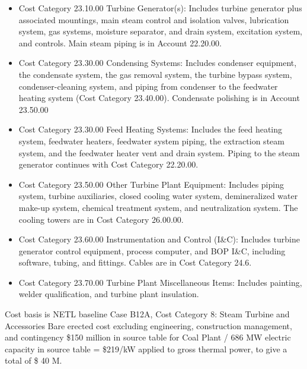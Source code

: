 \begin{itemize}
    \item Cost Category 23.10.00 Turbine Generator(s): Includes turbine generator plus associated mountings, main steam control and isolation valves, lubrication system, gas systems, moisture separator, and drain system, excitation system, and controls. Main steam piping is in Account 22.20.00.
    \item Cost Category 23.30.00 Condensing Systems: Includes condenser equipment, the condensate system, the gas removal system, the turbine bypass system, condenser-cleaning system, and piping from condenser to the feedwater heating system (Cost Category 23.40.00). Condensate polishing is in Account 23.50.00
    \item Cost Category 23.30.00 Feed Heating Systems: Includes the feed heating system, feedwater heaters, feedwater system piping, the extraction steam system, and the feedwater heater vent and drain system. Piping to the steam generator continues with Cost Category 22.20.00.
    \item Cost Category 23.50.00 Other Turbine Plant Equipment: Includes piping system, turbine auxiliaries, closed cooling water system, demineralized water make-up system, chemical treatment system, and neutralization system. The cooling towers are in Cost Category 26.00.00.
    \item Cost Category 23.60.00 Instrumentation and Control (I\&C): Includes turbine generator control equipment, process computer, and BOP I\&C, including software, tubing, and fittings. Cables are in Cost Category 24.6.
    \item Cost Category 23.70.00 Turbine Plant Miscellaneous Items: Includes painting, welder qualification, and turbine plant insulation.
\end{itemize}

Cost basis is NETL baseline Case B12A, Cost Category 8: Steam Turbine and Accessories Bare erected cost excluding engineering, construction management, and contingency \$150 million in source table for Coal Plant / 686 MW electric capacity in source table = \$219/kW applied to gross thermal power, to give a total of \$ 40 M.